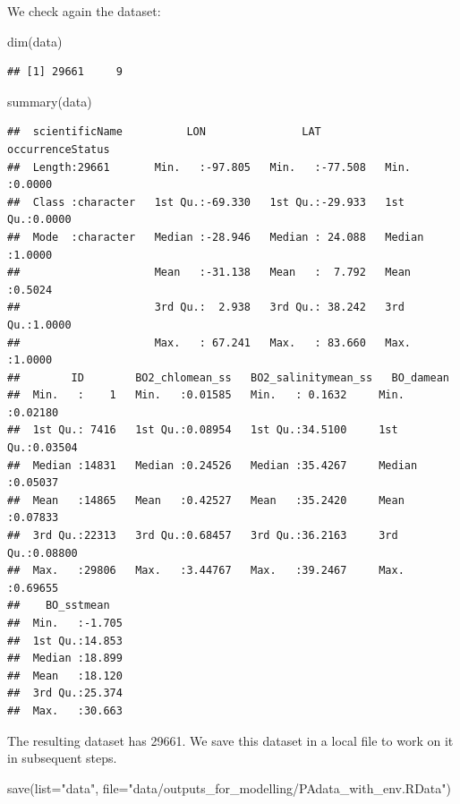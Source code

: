 \documentclass[
]{book}
\newenvironment{Shaded}{\begin{snugshade}}{\end{snugshade}}
\newcommand{\AttributeTok}[1]{\textcolor[rgb]{0.77,0.63,0.00}{#1}}
\newcommand{\FunctionTok}[1]{\textcolor[rgb]{0.00,0.00,0.00}{#1}}
\newcommand{\NormalTok}[1]{#1}
\newcommand{\StringTok}[1]{\textcolor[rgb]{0.31,0.60,0.02}{#1}}
\begin{document}
We check again the dataset:

\begin{Shaded}
\begin{Highlighting}[]
\FunctionTok{dim}\NormalTok{(data)}
\end{Highlighting}
\end{Shaded}

\begin{verbatim}
## [1] 29661     9
\end{verbatim}

\begin{Shaded}
\begin{Highlighting}[]
\FunctionTok{summary}\NormalTok{(data) }
\end{Highlighting}
\end{Shaded}

\begin{verbatim}
##  scientificName          LON               LAT          occurrenceStatus
##  Length:29661       Min.   :-97.805   Min.   :-77.508   Min.   :0.0000  
##  Class :character   1st Qu.:-69.330   1st Qu.:-29.933   1st Qu.:0.0000  
##  Mode  :character   Median :-28.946   Median : 24.088   Median :1.0000  
##                     Mean   :-31.138   Mean   :  7.792   Mean   :0.5024  
##                     3rd Qu.:  2.938   3rd Qu.: 38.242   3rd Qu.:1.0000  
##                     Max.   : 67.241   Max.   : 83.660   Max.   :1.0000  
##        ID        BO2_chlomean_ss   BO2_salinitymean_ss   BO_damean      
##  Min.   :    1   Min.   :0.01585   Min.   : 0.1632     Min.   :0.02180  
##  1st Qu.: 7416   1st Qu.:0.08954   1st Qu.:34.5100     1st Qu.:0.03504  
##  Median :14831   Median :0.24526   Median :35.4267     Median :0.05037  
##  Mean   :14865   Mean   :0.42527   Mean   :35.2420     Mean   :0.07833  
##  3rd Qu.:22313   3rd Qu.:0.68457   3rd Qu.:36.2163     3rd Qu.:0.08800  
##  Max.   :29806   Max.   :3.44767   Max.   :39.2467     Max.   :0.69655  
##    BO_sstmean    
##  Min.   :-1.705  
##  1st Qu.:14.853  
##  Median :18.899  
##  Mean   :18.120  
##  3rd Qu.:25.374  
##  Max.   :30.663
\end{verbatim}

The resulting dataset has 29661. We save this dataset in a local file to work on it in subsequent steps.

\begin{Shaded}
\begin{Highlighting}[]
\FunctionTok{save}\NormalTok{(}\AttributeTok{list=}\StringTok{"data"}\NormalTok{, }\AttributeTok{file=}\StringTok{"data/outputs\_for\_modelling/PAdata\_with\_env.RData"}\NormalTok{)}
\end{Highlighting}
\end{Shaded}
\end{document}
